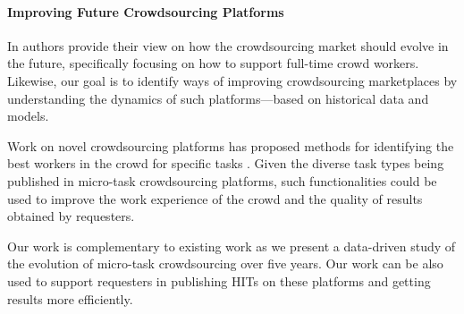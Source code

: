 
\paragraph{Improving Future Crowdsourcing Platforms}
In \cite{Kittur:2013:FCW:2441776.2441923} authors provide their view on how the crowdsourcing market should evolve in the future, specifically focusing on how to support full-time crowd workers. 
Likewise, our goal is to identify ways of improving crowdsourcing marketplaces by understanding the dynamics of such platforms---based on historical data and models.

Work on novel crowdsourcing platforms has  proposed methods for identifying the best workers in the crowd for specific tasks \cite{pickacrowd,bozzon}. Given the diverse task types being published in micro-task crowdsourcing platforms, such functionalities could be used to improve the work experience of the crowd and the quality of results obtained by requesters.

Our work is complementary to existing work as we present a data-driven study of the evolution of micro-task crowdsourcing over five years.
Our work can be also used to support requesters in publishing HITs on these platforms and getting results more efficiently.




